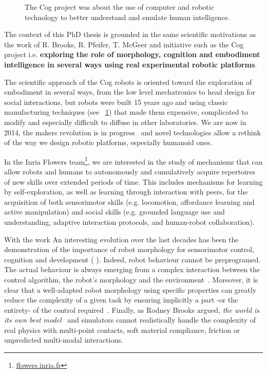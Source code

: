 \begin{figure}[t]
\centering
    \hfil
    \caption{The Cog project was about the use of computer and robotic technology to better understand and emulate human intelligence.}
    \label{fig:cog_project}
\end{figure}


The context of this PhD thesis is grounded in the same scientific motivations as the work of R. Brooks, R. Pfeifer, T. McGeer and initiative such as the Cog project i.e. \textbf{exploring the role of morphology, cognition and embodiment intelligence in several ways using real experimental robotic platforms}.

The scientific approach of the Cog robots is oriented toward the exploration of embodiment in several ways, from the low level mechatronics to head design for social interactions, but robots were built 15 years ago and using classic manufacturing techniques (see \figurename~\ref{fig:cog_project}) that made them expensive, complicated to modify and especially difficult to diffuse in other laboratories.
We are now in 2014, the makers revolution is in progress~\cite{anderson} and novel technologies allow a rethink of the way we design robotic platforms, especially humanoid ones.


In the Inria Flowers team\footnote{\url{flowers.inria.fr}}, we are interested in the study of mechanisms that can allow robots and humans to autonomously and cumulatively acquire repertoires of new skills over extended periods of time. This includes mechanisms for learning by self-exploration, as well as learning through interaction with peers, for the acquisition of both sensorimotor skills (e.g. locomotion, affordance learning and active manipulation) and social skills (e.g. grounded language use and understanding, adaptive interaction protocols, and human-robot collaboration).

With the work An interesting evolution over the last decades has been the demonstration of the importance of robot morphology for sensorimotor control, cognition and development (\cite{kaplan2008corps} \cite{steels1995artificial} \cite{Pfeifer06}). Indeed, robot behaviour cannot be preprogramed. The actual behaviour is always emerging from a complex interaction between the control algorithm, the robot’s morphology and the environment~\cite{Steels1991emergence}. Moreover, it is clear that a well-adapted robot morphology using specific properties can greatly reduce the complexity of a given task by ensuring implicitly a part -or the entirety- of the control required~\cite{pfeifer2005morphological}.
Finally, as Rodney Brooks argued, \emph{the world is its own best model}~\cite{brooks1991intelligence} and simulators cannot realistically handle the complexity of real physics with multi-point contacts, soft material compliance, friction or unpredicted multi-modal interactions.


